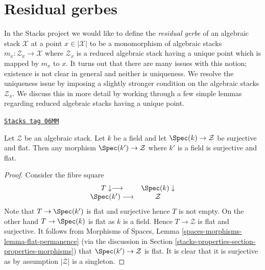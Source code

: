 \section{Residual gerbes}
\label{stacks-properties-section-residual-gerbe}
In the Stacks project we would like to define the {\it residual gerbe}
of an algebraic stack $\mathcal{X}$ at a point $x \in |\mathcal{X}|$
to be a monomorphism of algebraic stacks
$m_x : \mathcal{Z}_x \to \mathcal{X}$ where $\mathcal{Z}_x$ is a reduced
algebraic stack having a unique point which is mapped by $m_x$ to $x$.
It turns out that there are many issues with this notion; existence is not
clear in general and neither is uniqueness.
We resolve the uniqueness issue by imposing a slightly stronger
condition on the algebraic stacks $\mathcal{Z}_x$.
We discuss this in more detail by working through a few simple lemmas
regarding reduced algebraic stacks having a unique point.

\begin{lemma}
\label{stacks-properties-lemma-flat-cover-by-field}
\href{https://stacks.math.columbia.edu/tag/06MM}{\texttt{Stacks tag 06MM}}

Let $\mathcal{Z}$ be an algebraic stack. Let $k$ be a field and let
$\Spec(k) \to \mathcal{Z}$ be surjective and flat. Then any
morphism $\Spec(k') \to \mathcal{Z}$ where $k'$ is a field is
surjective and flat.
\end{lemma}

\begin{proof}
Consider the fibre square
$$
\begin{array}{cc}T \downarrow\longrightarrow & \Spec(k) \downarrow \\ \Spec(k') \longrightarrow & \mathcal{Z}\end{array}
$$
Note that $T \to \Spec(k')$ is flat and surjective hence $T$
is not empty. On the other hand $T \to \Spec(k)$ is flat as
$k$ is a field. Hence $T \to \mathcal{Z}$ is flat and surjective.
It follows from
Morphisms of Spaces, Lemma \ref{spaces-morphisms-lemma-flat-permanence}
(via the discussion in
Section \ref{stacks-properties-section-properties-morphisms})
that $\Spec(k') \to \mathcal{Z}$ is flat. It is clear that it
is surjective as by assumption $|\mathcal{Z}|$ is a singleton.
\end{proof}

